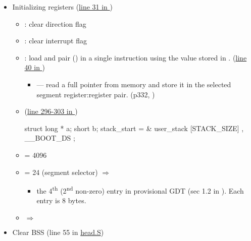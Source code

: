 \begin{itemize}
\item Initializing registers
  (\href{http://lxr.linux.no/linux+v2.6.11/arch/i386/boot/compressed/head.S#L31}{line 31
    in })

  \begin{varwidth}{.3\textwidth}
  \end{varwidth}
    \begin{itemize}
  \item {}: clear direction flag
  \item {}: clear interrupt flag
  \item {}: load  and  pair
    () in a single instruction using the value stored in
    .
    (\href{http://lxr.linux.no/linux+v2.6.11/arch/i386/boot/compressed/head.S#L40}{line 40
      in })
    \begin{itemize}
    \item {} --- read a full pointer from memory and store it in the selected
      segment register:register pair. (p332, \cite{intel86})
    \end{itemize}
  \item {}
    (\href{http://lxr.linux.no/linux+v2.6.11/arch/i386/boot/compressed/misc.c#L296}{line
      296-303 in })

    \begin{ccode}
      struct {
        long * a;
        short b;
      } stack_start = { & user_stack [STACK_SIZE] , __BOOT_DS };
    \end{ccode}
  \item {} = 4096
  \item {} = 24 (segment selector) $\Rightarrow$ 
    \begin{itemize}
    \item the 4\textsuperscript{th} (2\textsuperscript{nd} non-zero) entry in provisional
      GDT (sec 1.2 in \cite{abhishek2002memory}). Each entry is 8 bytes.
    \end{itemize}
  \item {} $\Rightarrow$ 
  \end{itemize}
\item Clear BSS (line 55 in
  \href{http://lxr.linux.no/linux+v2.6.11/arch/i386/boot/compressed/head.S#L55}{head.S})


\end{itemize}
